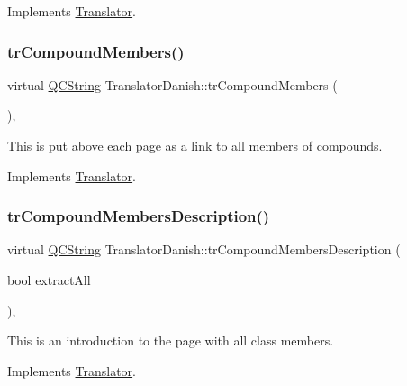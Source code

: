 Implements \mbox{\hyperlink{class_translator}{Translator}}.

\mbox{\label{class_translator_danish_aca09787007926f6be652b0361aacedf8}} 
\subsubsection{\texorpdfstring{trCompoundMembers()}{trCompoundMembers()}}
{\footnotesize\ttfamily virtual \mbox{\hyperlink{class_q_c_string}{Q\+C\+String}} Translator\+Danish\+::tr\+Compound\+Members (\begin{DoxyParamCaption}{ }\end{DoxyParamCaption})\hspace{0.3cm}{\ttfamily [inline]}, {\ttfamily [virtual]}}

This is put above each page as a link to all members of compounds. 

Implements \mbox{\hyperlink{class_translator}{Translator}}.

\mbox{\label{class_translator_danish_a176b7592eb6fd7c8d619154d4ef61db2}} 
\subsubsection{\texorpdfstring{trCompoundMembersDescription()}{trCompoundMembersDescription()}}
{\footnotesize\ttfamily virtual \mbox{\hyperlink{class_q_c_string}{Q\+C\+String}} Translator\+Danish\+::tr\+Compound\+Members\+Description (\begin{DoxyParamCaption}\item[{bool}]{extract\+All }\end{DoxyParamCaption})\hspace{0.3cm}{\ttfamily [inline]}, {\ttfamily [virtual]}}

This is an introduction to the page with all class members. 

Implements \mbox{\hyperlink{class_translator}{Translator}}.

\mbox{\label{class_translator_danish_ac672f73b85740797aabac6b958c83a53}} 
